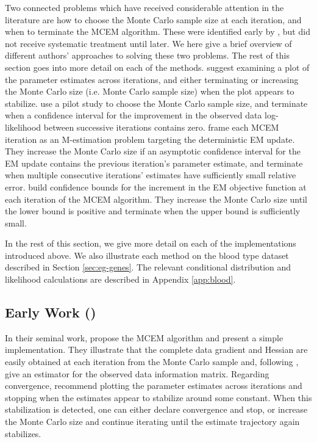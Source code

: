 \documentclass[11pt, oneside]{article}   	%
\begin{document}
Two connected problems which have received considerable attention in the literature are how to choose the Monte Carlo sample size at each iteration, and when to terminate the MCEM algorithm. These were identified early by \citet{Wei90}, but did not receive systematic treatment until later. We here give a brief overview of different authors' approaches to solving these two problems. The rest of this section goes into more detail on each of the methods. \citet{Wei90} suggest examining a plot of the parameter estimates across iterations, and either terminating or increasing the Monte Carlo size (i.e. Monte Carlo sample size) when the plot appears to stabilize. \citet{Cha95} use a pilot study to choose the Monte Carlo sample size, and terminate when a confidence interval for the improvement in the observed data log-likelihood between successive iterations contains zero. \citet{Boo99} frame each MCEM iteration as an M-estimation problem targeting the deterministic EM update. They increase the Monte Carlo size if an asymptotic confidence interval for the EM update contains the previous iteration's parameter estimate, and terminate when multiple consecutive iterations' estimates have sufficiently small relative error. \citet{Caf05} build confidence bounds for the increment in the EM objective function at each iteration of the MCEM algorithm. They increase the Monte Carlo size until the lower bound is positive and terminate when the upper bound is sufficiently small.

In the rest of this section, we give more detail on each of the implementations introduced above. We also illustrate each method on the blood type dataset described in Section \ref{sec:eg-genes}. The relevant conditional distribution and likelihood calculations are described in Appendix \ref{app:blood}.

\subsection{Early Work (\citealp{Wei90})}

In their seminal work, \citet{Wei90} propose the MCEM algorithm and present a simple implementation. They illustrate that the complete data gradient and Hessian are easily obtained at each iteration from the Monte Carlo sample and, following \citet{Lou82}, give an estimator for the observed data information matrix. Regarding convergence, \citeauthor{Wei90} recommend plotting the parameter estimates across iterations and stopping when the estimates appear to stabilize around some constant. When this stabilization is detected, one can either declare convergence and stop, or increase the Monte Carlo size and continue iterating until the estimate trajectory again stabilizes.
\end{document}
